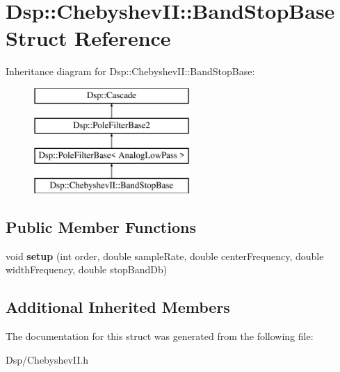 \hypertarget{structDsp_1_1ChebyshevII_1_1BandStopBase}{\section{Dsp\-:\-:Chebyshev\-I\-I\-:\-:Band\-Stop\-Base Struct Reference}
\label{structDsp_1_1ChebyshevII_1_1BandStopBase}
}
Inheritance diagram for Dsp\-:\-:Chebyshev\-I\-I\-:\-:Band\-Stop\-Base\-:\begin{figure}[H]
\begin{center}
\leavevmode
\includegraphics[height=4.000000cm]{structDsp_1_1ChebyshevII_1_1BandStopBase}
\end{center}
\end{figure}
\subsection*{Public Member Functions}
\begin{DoxyCompactItemize}
\item 
\hypertarget{structDsp_1_1ChebyshevII_1_1BandStopBase_a826fa4ad4cd2bf09e3eb3a5df924377f}{void {\bfseries setup} (int order, double sample\-Rate, double center\-Frequency, double width\-Frequency, double stop\-Band\-Db)}\label{structDsp_1_1ChebyshevII_1_1BandStopBase_a826fa4ad4cd2bf09e3eb3a5df924377f}

\end{DoxyCompactItemize}
\subsection*{Additional Inherited Members}


The documentation for this struct was generated from the following file\-:\begin{DoxyCompactItemize}
\item 
Dsp/Chebyshev\-I\-I.\-h\end{DoxyCompactItemize}
